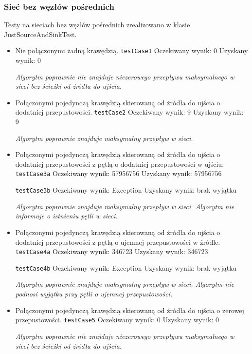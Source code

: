 \subsubsection{Sieć bez węzłów pośrednich}
Testy na sieciach bez węzłów pośrednich zrealizowano w klasie JustSourceAndSinkTest.
\begin{itemize}[nosep]
    \item Nie połączonymi żadną krawędzią.
    \texttt{testCase1}
    Oczekiwany wynik: 0
    Uzyskany wynik: 0

    \emph{Algorytm poprawnie nie znajduje niezerowego
    przepływu maksymalnego w sieci bez ścieżki od źródła do ujścia.}

    \item Połączonymi pojedynczą krawędzią skierowaną od źródła do ujścia o dodatniej przepustowości.
    \texttt{testCase2}
    Oczekiwany wynik: 9
    Uzyskany wynik: 9

    \emph{Algorytm poprawnie znajduje maksymalny przepływ w sieci.}

    \item Połączonymi pojedynczą krawędzią skierowaną od źródła do ujścia o dodatniej przepustowości z pętlą o dodatniej przepustowości w ujściu.
    \texttt{testCase3a}
    Oczekiwany wynik: 57956756
    Uzyskany wynik: 57956756

    \texttt{testCase3b}
    Oczekiwany wynik: Exception
    Uzyskany wynik: brak wyjątku

    \emph{Algorytm poprawnie znajduje maksymalny przepływ
w sieci. Algorytm nie informuje o istnieniu pętli w sieci.}

    \item Połączonymi pojedynczą krawędzią skierowaną od źródła do ujścia o dodatniej przepustowości z pętlą o ujemnej przepustowości w źródle.
    \texttt{testCase4a}
    Oczekiwany wynik: 346723
    Uzyskany wynik: 346723

    \texttt{testCase4b}
    Oczekiwany wynik: Exception
    Uzyskany wynik: brak wyjątku

    \emph{Algorytm poprawnie znajduje maksymalny przepływ
    w sieci. Algorytm nie podnosi wyjątku przy pętli o ujemnej przepustowości.}

    \item Połączonymi pojedynczą krawędzią skierowaną od źródła do ujścia o zerowej przepustowości.
    \texttt{testCase5}
    Oczekiwany wynik: 0
    Uzyskany wynik: 0

    \emph{Algorytm poprawnie nie znajduje niezerowego przepływu
    maksymalnego w sieci bez ścieżki od źródła do ujścia.}


\end{itemize}
